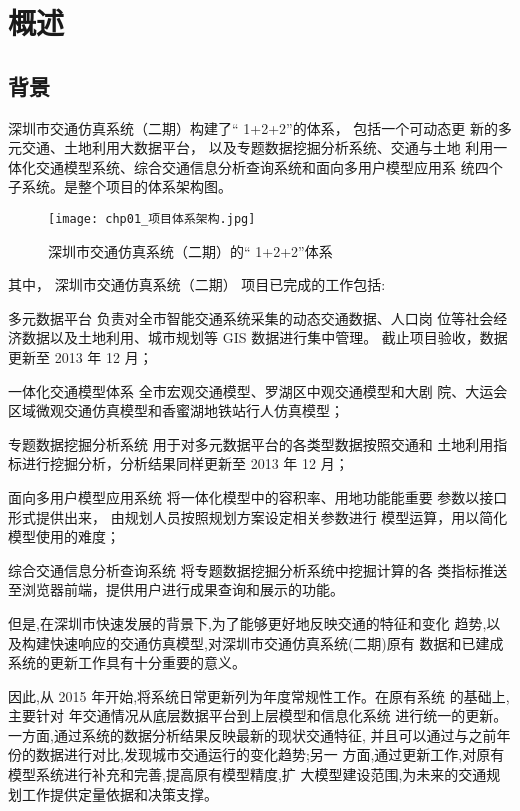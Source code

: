 

\chapter{概述}

\section{背景} 
深圳市交通仿真系统（二期）构建了“ 1+2+2”的体系， 包括一个可动态更
新的多元交通、土地利用大数据平台， 以及专题数据挖掘分析系统、交通与土地
利用一体化交通模型系统、综合交通信息分析查询系统和面向多用户模型应用系
统四个子系统。是整个项目的体系架构图。

\begin{figure}[!hbt]
  \centering
  \texttt{[image: chp01\_项目体系架构.jpg]}
  \caption{深圳市交通仿真系统（二期）的“ 1+2+2”体系\label{fig:项目体系架构}}
\end{figure}

其中， 深圳市交通仿真系统（二期） 项目已完成的工作包括:

\begin{para}
\item[多元数据平台] 负责对全市智能交通系统采集的动态交通数据、人口岗
位等社会经济数据以及土地利用、城市规划等 GIS 数据进行集中管理。
截止项目验收，数据更新至 2013 年 12 月；
\item[一体化交通模型体系] 全市宏观交通模型、罗湖区中观交通模型和大剧
院、大运会区域微观交通仿真模型和香蜜湖地铁站行人仿真模型；
\item[专题数据挖掘分析系统] 用于对多元数据平台的各类型数据按照交通和
土地利用指标进行挖掘分析，分析结果同样更新至 2013 年 12 月；
\item[面向多用户模型应用系统] 将一体化模型中的容积率、用地功能能重要
参数以接口形式提供出来， 由规划人员按照规划方案设定相关参数进行
模型运算，用以简化模型使用的难度；
\item[综合交通信息分析查询系统] 将专题数据挖掘分析系统中挖掘计算的各
类指标推送至浏览器前端，提供用户进行成果查询和展示的功能。
\end{para}

但是,在深圳市快速发展的背景下,为了能够更好地反映交通的特征和变化
趋势,以及构建快速响应的交通仿真模型,对深圳市交通仿真系统(二期)原有
数据和已建成系统的更新工作具有十分重要的意义。

因此,从 2015 年开始,将系统日常更新列为年度常规性工作。在原有系统
的基础上,主要针对 \pyear 年交通情况从底层数据平台到上层模型和信息化系统
进行统一的更新。一方面,通过系统的数据分析结果反映最新的现状交通特征,
并且可以通过与之前年份的数据进行对比,发现城市交通运行的变化趋势;另一
方面,通过更新工作,对原有模型系统进行补充和完善,提高原有模型精度,扩
大模型建设范围,为未来的交通规划工作提供定量依据和决策支撑。

